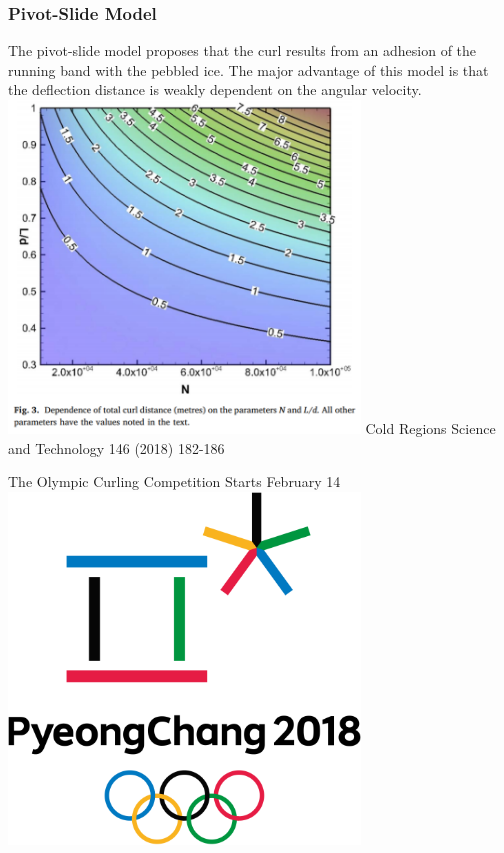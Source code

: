 \documentclass{beamer}
\begin{document}
\begin{frame}\frametitle{Pivot-Slide Model}
    The pivot-slide model proposes that the curl results from an adhesion of the running band with the pebbled ice. The major advantage of this model is that the deflection distance is weakly dependent on the angular velocity.
    \centering
    \includegraphics[width=0.7\textwidth]{Images/Pivot_Fig.png}
    \scriptsize{Cold Regions Science and Technology 146 (2018) 182-186}
\end{frame}

\begin{frame}{The Olympic Curling Competition Starts February 14}
    \centering
    \includegraphics[width=0.7\textwidth]{Images/Olympics.png}
\end{frame}
\end{document}
